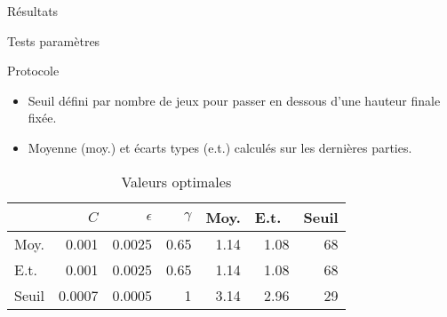 \documentclass[tikz, footheight=2em]{beamer}
\begin{document}
\begin{frame}[c]{Résultats}
  \begin{figure}[H]
  \end{figure}
\end{frame}

\begin{frame}[c]{Tests paramètres}
  \begin{block}{Protocole}
    \begin{itemize}
      \item Seuil défini par nombre de jeux pour passer en dessous d'une
        hauteur finale fixée.
      \item Moyenne (moy.) et écarts types (e.t.) calculés sur les dernières
        parties.
    \end{itemize}
  \end{block}
  \pause{}
  \begin{table}
    \centering
    \begin{tabulary}{\linewidth}{|C|r|r|r||r|r|r|}
      \hline
      & \(C\) & \(\epsilon\) & \(\gamma\) & Moy. & E.t.\ & Seuil\\
      \hline
      Moy. & 0.001 & 0.0025 & 0.65 & 1.14 & 1.08 & 68\\
      \hline
      E.t.\ & 0.001 & 0.0025 & 0.65 & 1.14 & 1.08 & 68\\
      \hline
      Seuil & 0.0007 & 0.0005 & 1 & 3.14 & 2.96 & 29\\
      \hline
    \end{tabulary}
    \caption{Valeurs optimales}\label{tab:param}
  \end{table}
\end{frame}
\end{document}
